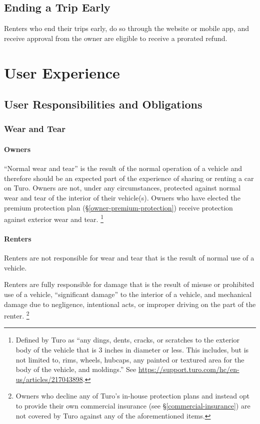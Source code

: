 \documentclass[review,12pt]{elsarticle}
\begin{document}
  \subsection{Ending a Trip Early}
  Renters who end their trips early, do so through the website or mobile app, and receive approval from the owner are eligible to receive a prorated refund.


\section{User Experience}
\subsection{User Responsibilities and Obligations}
  \subsubsection{Wear and Tear}
    \paragraph{Owners}
    ``Normal wear and tear'' is the result of the normal operation of a vehicle and therefore should be an expected part of the experience of sharing or renting a car on Turo. Owners are not, under any circumstances, protected against normal wear and tear of the interior of their vehicle(s). Owners who have elected the premium protection plan (\S\ref{owner-premium-protection}) receive protection against exterior wear and tear.
      \footnote{Defined by Turo as ``any dings, dents, cracks, or scratches to the exterior body of the vehicle that is 3 inches in diameter or less. This includes, but is not limited to, rims, wheels, hubcaps, any painted or textured area for the body of the vehicle, and moldings.'' See \url{https://support.turo.com/hc/en-us/articles/217043898}.
      }
    \paragraph{Renters}
    Renters are not responsible for wear and tear that is the result of normal use of a vehicle.

    Renters are fully responsible for damage that is the result of misuse or prohibited use of a vehicle, ``significant damage'' to the interior of a vehicle, and mechanical damage due to negligence, intentional acts, or improper driving on the part of the renter.
      \footnote{Owners who decline any of Turo's in-house protection plans and instead opt to provide their own commercial insurance (see \S\ref{commercial-insurance}) are not covered by Turo against any of the aforementioned items.
      }
\end{document}
